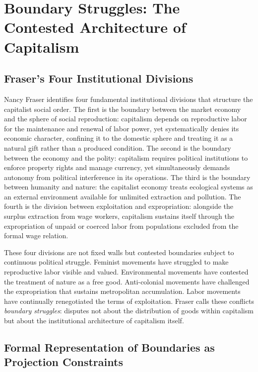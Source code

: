 \documentclass[12pt,a4paper]{article}
\theoremstyle{definition}
\theoremstyle{remark}
\begin{document}
\section{Boundary Struggles: The Contested Architecture of Capitalism}
\label{sec:boundary}

\subsection{Fraser's Four Institutional Divisions}

Nancy Fraser identifies four fundamental institutional divisions that structure the capitalist social order. The first is the boundary between the market economy and the sphere of social reproduction: capitalism depends on reproductive labor for the maintenance and renewal of labor power, yet systematically denies its economic character, confining it to the domestic sphere and treating it as a natural gift rather than a produced condition. The second is the boundary between the economy and the polity: capitalism requires political institutions to enforce property rights and manage currency, yet simultaneously demands autonomy from political interference in its operations. The third is the boundary between humanity and nature: the capitalist economy treats ecological systems as an external environment available for unlimited extraction and pollution. The fourth is the division between exploitation and expropriation: alongside the surplus extraction from wage workers, capitalism sustains itself through the expropriation of unpaid or coerced labor from populations excluded from the formal wage relation.

These four divisions are not fixed walls but contested boundaries subject to continuous political struggle. Feminist movements have struggled to make reproductive labor visible and valued. Environmental movements have contested the treatment of nature as a free good. Anti-colonial movements have challenged the expropriation that sustains metropolitan accumulation. Labor movements have continually renegotiated the terms of exploitation. Fraser calls these conflicts \emph{boundary struggles}: disputes not about the distribution of goods within capitalism but about the institutional architecture of capitalism itself.

\subsection{Formal Representation of Boundaries as Projection Constraints}
\end{document}
